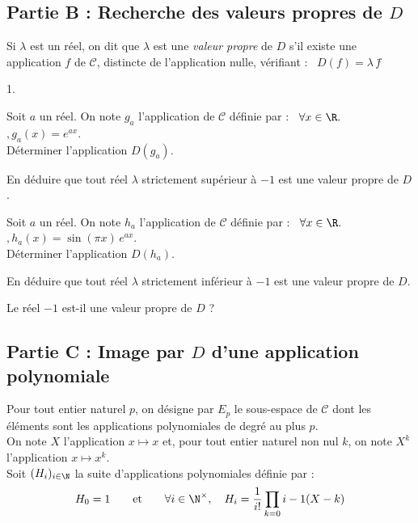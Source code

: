 \documentclass[11pt]{article}%
\begin{document}
\subsection*{Partie B : Recherche des valeurs propres de $D$}

Si $\lambda $ est un réel, on dit que $\lambda $ est une \textit{valeur
propre} de $D$ s'il existe une application $f$ de $\mathcal{C}$,
distincte
de l'application nulle, vérifiant : \ $D(f) = \lambda \,f$\.

\begin{noliste}{1.}
 \setlength{\itemsep}{4mm}
\item Soit $a$ un réel. On note $g_{a}$ l'application de $\mathcal{C}$
définie par : \ $\forall x\in \R.$ $,g_{a}(x) = e^{ax}$.\\
Déterminer l'application $D(g_{a})$.

\item En déduire que tout réel $\lambda$ strictement supérieur à $-1$
est une valeur propre de $D$.

\item Soit $a$ un réel. On note $h_{a}$ l'application de $\mathcal{C}$
définie par : \ $\forall x\in \R.$ $,h_{a}(x) = \sin (\pi x)\,e^{ax}$. 
\\
Déterminer l'application $D(h_{a})$.

\item En déduire que tout réel $\lambda$ strictement inférieur à $-1$
est une valeur propre de $D$.

\item Le réel $-1$ est-il une valeur propre de $D$ ?
\end{noliste}

\subsection*{Partie C : Image par $D$ d'une application polynomiale}

Pour tout entier naturel $p$, on désigne par $E_{p}$ le sous-espace de
$\mathcal{C}$ dont les éléments sont les applications polynomiales de
degré
au plus $p$.\\
On note $X$ l'application $x\mapsto x$ et, pour tout entier naturel non
nul $k$, on note $X^{k}$ l'application $x\mapsto x^{k}$.\\
Soit $(H_{i})_{i\in \N}$ la suite d'applications polynomiales définie
par : 
\[
H_{0} = 1\qquad \text{et}\qquad \forall i\in \N^{\times },\quad H_{i} =
\dfrac{1}{i!}\prod_{k = 0}{i-1}(X-k)
\]
\end{document}
